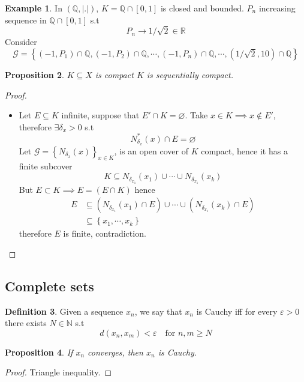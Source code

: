 \documentclass[11pt,a4paper]{article}
\theoremstyle{definition}
\newtheorem{definition}{Definition}[section]
\newtheorem{example}[definition]{Example}
\theoremstyle{plain}
\newtheorem{proposition}[definition]{Proposition}
\theoremstyle{remark}
\newcommand{\R}{\mathbb{R}}
\newcommand{\N}{\mathbb{N}}
\newcommand{\Q}{\mathbb{Q}}
\renewcommand{\set}[1]{\left\{ #1 \right\}}
\newcommand{\abs}[1]{\lvert #1 \rvert}
\begin{document}
\begin{example}
    In $(\Q, \abs{.})$, $K = \Q \cap [0,1]$ is closed and bounded. $P_n$ increasing sequence in $\Q \cap [0,1]$ s.t 
    $$P_n \to 1/\sqrt{2} \in \R$$
    Consider 
    $$\mathcal{G} = \set{(-1, P_1) \cap \Q, (-1, P_2) \cap \Q, \cdots, (-1, P_n) \cap \Q, \cdots, (1/\sqrt{2}, 10) \cap \Q}$$
\end{example}

\begin{proposition}
    $K \subseteq X$ is compact $K$ is sequentially compact.     
\end{proposition}

\begin{proof}
    \begin{itemize}
        \item Let $E \subseteq K$ infinite, suppose that $E' \cap K = \varnothing$. Take $x \in K \implies x \not\in E'$, 
        therefore $\exists \delta_x > 0$ s.t 
        $$N_{\delta_x}^*(x) \cap E = \varnothing$$
        Let $\mathcal{G} = \set{N_{\delta_x}(x)}_{x \in K}$, is an open cover of $K$ compact, hence it has a finite subcover 
        $$K \subseteq N_{\delta_{x_1}} (x_1) \cup \cdots \cup N_{\delta_{x_1}}(x_k)$$
        But $E \subset K \implies E = (E \cap K)$ hence 
        \begin{align*}
            E &\subseteq (N_{\delta_{x_1}} (x_1) \cap E) \cup \cdots \cup (N_{\delta_{x_1}}(x_k) \cap E)\\
            &\subseteq \set{x_1, \cdots, x_k}
        \end{align*}
        therefore $E$ is finite, contradiction.
    \end{itemize}
\end{proof}

\subsection{Complete sets}
\begin{definition}
    Given a sequence $x_n$, we say that $x_n$ is Cauchy iff for every $\varepsilon > 0$ there exists $N \in \N$ s.t 
    $$d(x_n, x_m) < \varepsilon \quad \text{for $n, m \geq N$}$$
\end{definition}

\begin{proposition}
    If $x_n$ converges, then $x_n$ is Cauchy. 
\end{proposition}

\begin{proof}
    Triangle inequality.
\end{proof}
\end{document}
